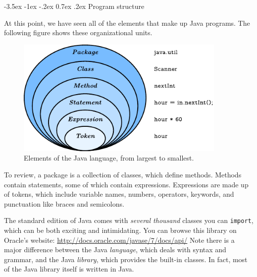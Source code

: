 \documentclass[12pt]{book}
\makeatletter
\theoremstyle{exercise}
\newcommand{\java}[1]{\verb"#1"}
\renewcommand{\section}{\@startsection{section}{1}{\z@}%
    {-3.5ex \@plus -1ex \@minus -.2ex}%
    {0.7ex \@plus.2ex}%
    {\normalfont\Large\bfseries}}
\newcommand{\java}[1]{\lstinline{#1}} %
\makeatother
\begin{document}
\section{Program structure}
\label{sec:library}

At this point, we have seen all of the elements that make up Java programs.
The following figure shows these organizational units.

\begin{figure}[!h]
\begin{center}
\includegraphics[width=4in]{figs/package.pdf}
\caption{Elements of the Java language, from largest to smallest.}
\end{center}
\end{figure}

To review, a package is a collection of classes, which define methods.
Methods contain statements, some of which contain expressions.
Expressions are made up of tokens, which include variable names, numbers, operators, keywords, and punctuation like braces and semicolons.

The standard edition of Java comes with {\em several thousand} classes you can \java{import}, which can be both exciting and intimidating.
You can browse this library on Oracle's website: \url{http://docs.oracle.com/javase/7/docs/api/}
Note there is a major difference between the Java {\em language}, which deals with syntax and grammar, and the Java {\em library}, which provides the built-in classes.
In fact, most of the Java library itself is written in Java.



\end{document}
